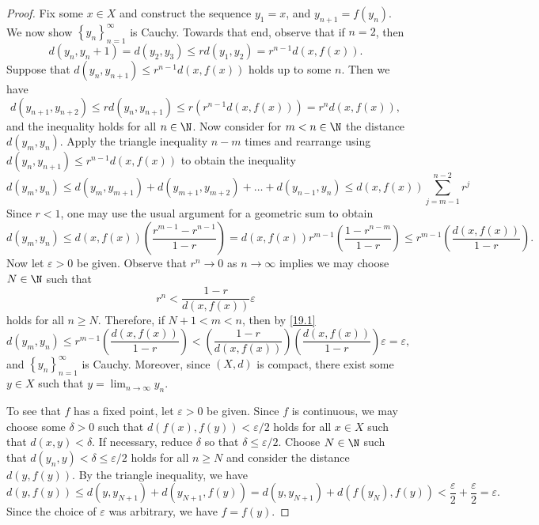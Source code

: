 \documentclass[12pt]{amsart}
\begin{document}
\begin{setup}
\begin{proof}
    Fix some $x \in X$ and construct the sequence $y_1 = x$, and $y_{n+1} = f(y_n)$.
    We now show $\left\{y_n\right\}_{n=1}^\infty$ is Cauchy.
    Towards that end, observe that if $n=2$, then 
    $$d(y_n, y_n+1) = d(y_2, y_3) \leq rd(y_1, y_2) = r^{n-1}d(x,f(x)).$$
    Suppose that $d(y_n, y_{n+1}) \leq r^{n-1} d(x,f(x))$ holds up to some $n$.
    Then we have $$d\left(y_{n+1}, y_{n+2}\right) \leq r d\left(y_n, y_{n+1}\right) \leq r\left(r^{n-1}d\left(x, f\left(x\right)\right)\right) = r^n d\left(x, f\left(x\right)\right),$$
    and the inequality holds for all $n \in \N$.
    Now consider for $m < n \in \N$ the distance $d\left(y_m, y_n\right)$.
    Apply the triangle inequality $n-m$ times and rearrange using $d(y_n, y_{n+1}) \leq r^{n-1} d\left(x,f\left(x\right)\right)$ to obtain the inequality 
    $$d(y_m, y_n) \leq d(y_m, y_{m+1}) + d(y_{m+1}, y_{m+2}) + \ldots + d(y_{n-1}, y_n) \leq d(x,f(x)) \sum_{j=m-1}^{n-2}r^j$$
    Since $r < 1$, one may use the usual argument for a geometric sum to obtain
    \begin{equation}\label{19.1}
      d(y_m, y_n) \leq d(x,f(x))\left(\frac{r^{m-1} - r^{n-1}}{1-r}\right) = d(x,f(x))r^{m-1}\left(\frac{1 - r^{n-m}}{1-r}\right) \leq r^{m-1}\left(\frac{d(x,f(x))}{1-r}\right).
    \end{equation}
    Now let $\varepsilon > 0$ be given.
    Observe that $r^n \rightarrow 0$ as $n \rightarrow \infty$ implies we may choose $N \in \N$ such that 
    $$r^{n} < \frac{1-r}{d(x,f(x))}\varepsilon$$
    holds for all $n \geq N$.
    Therefore, if $N+1 < m < n$, then by \eqref{19.1}
    $$d(y_m, y_n) \leq r^{m-1}\left(\frac{d(x,f(x))}{1-r}\right) < \left(\frac{1-r}{d(x,f(x))}\right)\left(\frac{d(x,f(x))}{1-r}\right)\varepsilon = \varepsilon,$$
    and $\left\{y_n\right\}_{n=1}^{\infty}$ is Cauchy.
    Moreover, since $(X,d)$ is compact, there exist some $y \in X$ such that $y = \lim_{n \rightarrow \infty} y_n$.
    
    To see that $f$ has a fixed point, let $\varepsilon > 0$ be given.
    Since $f$ is continuous, we may choose some $\delta > 0$ such that $d(f(x), f(y)) < \varepsilon/2$ holds for all $x \in X$ such that $d(x,y) < \delta$.
    If necessary, reduce $\delta$ so that $\delta \leq \varepsilon/2$.
    Choose $N \in \N$ such that $d(y_n, y) < \delta \leq \varepsilon/2$ holds for all $n \geq N$ and consider the distance $d(y,f(y))$.
    By the triangle inequality, we have 
    $$d(y, f(y)) \leq d(y, y_{N+1}) + d(y_{N+1}, f(y)) = d(y, y_{N+1}) + d(f(y_N), f(y))< \frac{\varepsilon}{2} + \frac{\varepsilon}{2} = \varepsilon.$$
    Since the choice of $\varepsilon$ was arbitrary, we have $f = f(y)$.
    

\end{proof}
\end{setup}
\end{document}

